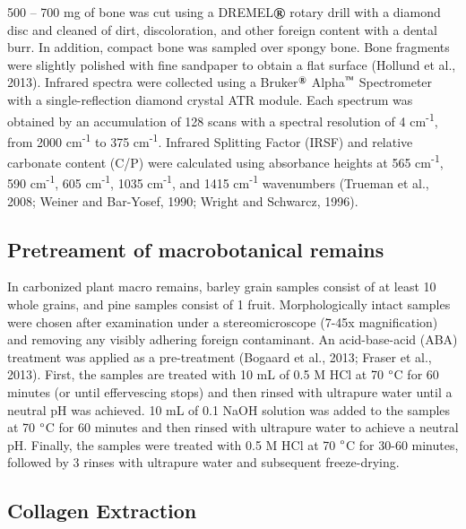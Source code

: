 \documentclass[5p]{elsarticle} %
\begin{document}
500 -- 700 mg of bone was cut using a DREMEL\(\text{\textregistered}\) rotary drill with a diamond disc and cleaned of dirt, discoloration, and other foreign content with a dental burr. In addition, compact bone was sampled over spongy bone. Bone fragments were slightly polished with fine sandpaper to obtain a flat surface (Hollund et al., 2013). Infrared spectra were collected using a Bruker\(^\text{\textregistered}\) Alpha\(^\text{\texttrademark}\) Spectrometer with a single-reflection diamond crystal ATR module. Each spectrum was obtained by an accumulation of 128 scans with a spectral resolution of 4 cm\textsuperscript{-1}, from 2000 cm\textsuperscript{-1} to 375 cm\textsuperscript{-1}. Infrared Splitting Factor (IRSF) and relative carbonate content (C/P) were calculated using absorbance heights at 565 cm\textsuperscript{-1}, 590 cm\textsuperscript{-1}, 605 cm\textsuperscript{-1}, 1035 cm\textsuperscript{-1}, and 1415 cm\textsuperscript{-1} wavenumbers (Trueman et al., 2008; Weiner and Bar-Yosef, 1990; Wright and Schwarcz, 1996).

\hypertarget{pretreament-of-macrobotanical-remains}{%
\subsection{Pretreament of macrobotanical remains}\label{pretreament-of-macrobotanical-remains}}

In carbonized plant macro remains, barley grain samples consist of at least 10 whole grains, and pine samples consist of 1 fruit. Morphologically intact samples were chosen after examination under a stereomicroscope (7-45x magnification) and removing any visibly adhering foreign contaminant. An acid-base-acid (ABA) treatment was applied as a pre-treatment (Bogaard et al., 2013; Fraser et al., 2013). First, the samples are treated with 10 mL of 0.5 M HCl at 70 \(\text{\textdegree}\)C for 60 minutes (or until effervescing stops) and then rinsed with ultrapure water until a neutral pH was achieved. 10 mL of 0.1 NaOH solution was added to the samples at 70 \(\text{\textdegree}\)C for 60 minutes and then rinsed with ultrapure water to achieve a neutral pH. Finally, the samples were treated with 0.5 M HCl at 70 \(\text{\textdegree}\)C for 30-60 minutes, followed by 3 rinses with ultrapure water and subsequent freeze-drying.

\hypertarget{collagen-extraction}{%
\subsection{Collagen Extraction}\label{collagen-extraction}}
\end{document}

